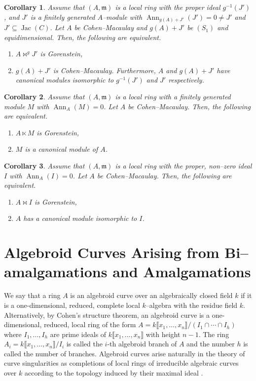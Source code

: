 \documentclass{amsart}%
\theoremstyle{plain}
\newtheorem{corollary}{Corollary}[section]
\numberwithin{equation}{section}
\theoremstyle{definition}
\DeclareMathOperator{\jac}{Jac}
\DeclareMathOperator{\Ann}{Ann}
\begin{document}
\begin{corollary}
        Assume that $(A,\mathfrak{m})$ is a local ring with the proper ideal $g^{-1}(J')$, and $J'$ is a finitely generated $A$--module with $\Ann_{g(A)+J'}(J')=0\neq J'$ and $J'\subseteq \jac(C)$. Let $A$ be Cohen--Macaulay and $g(A)+J'$ be $(S_1)$ and equidimensional. Then, the following are equivalent.
    \begin{enumerate}
        \item $A\bowtie^{g}J'$ is Gorenstein,
        \item $g(A)+J'$ is Cohen--Macaulay. Furthermore, $A$ and $g(A)+J'$ have canonical modules isomorphic to $g^{-1}(J')$ and $J'$ respectively.
    \end{enumerate}
\end{corollary}
\begin{corollary}
        Assume that $(A,\mathfrak{m})$ is a local ring with a finitely generated module $M$ with $\Ann_A(M)=0$. Let $A$ be Cohen--Macaulay. Then, the following are equivalent.
    \begin{enumerate}
        \item $A\ltimes M $ is Gorenstein,
        \item $M$ is a canonical module of $A$.
    \end{enumerate}
\end{corollary}
\begin{corollary}
        Assume that $(A,\mathfrak{m})$ is a local ring with the proper, non--zero ideal $I$ with $\Ann_{A}(I)=0$. Let $A$ be Cohen--Macaulay. Then, the following are equivalent.
    \begin{enumerate}
        \item $A\bowtie I$ is Gorenstein,
        \item $A$ has a canonical module isomorphic to $I$.
    \end{enumerate}
\end{corollary}



\section{Algebroid Curves Arising from Bi--amalgamations and Amalgamations}

    We say that a ring $A$ is an algebroid curve over an algebraically closed field $k$ if it is a one-dimensional, reduced, complete local $k$--algebra with the residue field $k$. Alternatively, by Cohen's structure theorem, an algebroid curve is a one-dimensional, reduced, local ring of the form $A=k\llbracket x_1,\ldots ,x_n\rrbracket/\left( I_1 \cap \cdots\cap I_h\right)$ where $I_1,\ldots,I_h$ are prime ideals of $k\llbracket x_1,\ldots ,x_n\rrbracket$ with height $n-1$. The ring $A_i=k\llbracket x_1,\ldots ,x_n\rrbracket/I_i$ is called the $i$-th algebroid branch of $A$ and the number $h$ is called the number of branches. Algebroid curves arise naturally in the theory of curve singularities as completions of local rings of irreducible algebraic curves over $k$ according to the topology induced by their maximal ideal \cite{Gorenstein}. \medskip
\end{document}
